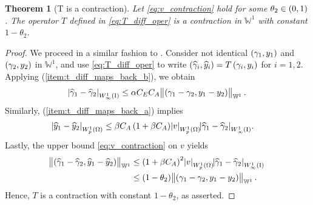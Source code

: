 \documentclass[final]{siamltex}
\newtheorem{thm}[theorem]{Theorem}
\begin{document}
\begin{thm}[T is a contraction] \label{thm:t_contraction2}  Let \eqref{eq:v_contraction} hold for some $\theta_2 \in \intoo{0,1}$. The operator $T$ defined in \eqref{eq:T_diff_oper} is a contraction in ${\mathbb{W}}^1$ with constant $1-\theta_2$.
\end{thm}
\begin{proof} We proceed in a similar fashion to . 
Consider not identical $\del{\gamma_1, y_1}$ and $\del{\gamma_2, y_2}$ in ${\mathbb{W}}^1$, and use \eqref{eq:T_diff_oper} to write $\del{{\widehat \gamma}_i, {\widehat y}_i} = T\del{\gamma_i, y_i}$ for $i=1,2$. Applying  (\ref{item:t_diff_maps_back_b}), we obtain 
	\begin{align*}
		{\abs{{{\widehat \gamma}_1 - {\widehat \gamma}_2}}_{{W^{{1}}_{{\infty}}\del{{\text{\rm I}}}}}} \leq
			\alpha C_E C_A\norm{\del{\gamma_1 - \gamma_2, y_1-y_2}}_{{\mathbb{W}}^1}.
	\end{align*}
Similarly,   (\ref{item:t_diff_maps_back_a}) implies
	\begin{align*}
		{\abs{{{\widehat y}_1 - {\widehat y}_2}}_{{W^{{{1}}}_{{{p}}}\del{{{\Omega}}}}}} 
			&\leq \beta C_A\del{1+\beta C_A}{\abs{{v}}_{{W^{{1}}_{{p}}\del{{\Omega}}}}}{\abs{{{\widehat \gamma}_1 - {\widehat \gamma}_2}}_{{W^{{{1}}}_{{{\infty}}}\del{{\text{\rm I}}}}}}.
	\end{align*}
Lastly, the upper bound \eqref{eq:v_contraction} on $v$ yields
	\begin{align*}
		\norm{\del{{\widehat \gamma}_1 - {\widehat \gamma}_2, {\widehat y}_1 - {\widehat y}_2}}_{{\mathbb{W}}^1}
			&\leq \del{1+\beta C_A}^2{\abs{{v}}_{{W^{{1}}_{{p}}\del{{\Omega}}}}}{\abs{{{\widehat \gamma}_1-{\widehat \gamma}_2}}_{{W^{{1}}_{{\infty}}\del{{\text{\rm I}}}}}} \\			
			&\leq \del{1-\theta_2}\norm{\del{\gamma_1-\gamma_2, y_1 - y_2}}_{{\mathbb{W}}^1}.
	\end{align*}
Hence, $T$ is a contraction with constant $1-\theta_2$, as asserted.
\end{proof}
\end{document}
